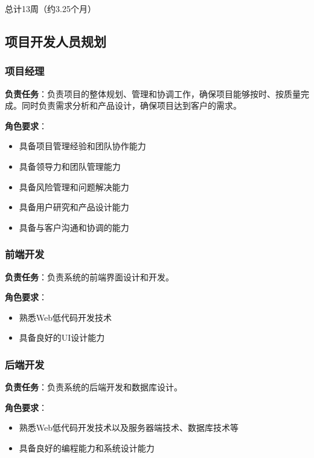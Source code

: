 总计13周（约3.25个月）

\subsection{项目开发人员规划}

\subsubsection{项目经理}

\textbf{负责任务}：负责项目的整体规划、管理和协调工作，确保项目能够按时、按质量完成。同时负责需求分析和产品设计，确保项目达到客户的需求。

\textbf{角色要求}：
\begin{itemize}[itemsep=2pt,topsep=0pt,parsep=0pt,itemindent=1em]
    \item 具备项目管理经验和团队协作能力
    \item 具备领导力和团队管理能力
    \item 具备风险管理和问题解决能力
    \item 具备用户研究和产品设计能力
    \item 具备与客户沟通和协调的能力
\end{itemize}

\subsubsection{前端开发}
\textbf{负责任务}：负责系统的前端界面设计和开发。

\textbf{角色要求}：
\begin{itemize}[itemsep=2pt,topsep=0pt,parsep=0pt,itemindent=1em]
    \item 熟悉Web低代码开发技术
    \item 具备良好的UI设计能力
\end{itemize}

\subsubsection{后端开发}
\textbf{负责任务}：负责系统的后端开发和数据库设计。

\textbf{角色要求}：
\begin{itemize}[itemsep=2pt,topsep=0pt,parsep=0pt,itemindent=1em]
    \item 熟悉Web低代码开发技术以及服务器端技术、数据库技术等
    \item 具备良好的编程能力和系统设计能力
\end{itemize}

